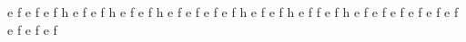 
%
%
\def\freqbarno{9999}
%
\ifx\medleyflag\relax\else
  \nopagenumbers{}\medtall\medwidewidth\fi
\newpitch\newgrace\noautoglue
%
\relax
%
%
%
\generalmeter{\meterC}
\debutmorceau
{}%
\setdoublebar\xbarre
\notes\grg\qlp e\etn
\pince f\cc\etn
\grg\qlc\etn
\echoN\qla\enotes\xbarre
\notes\grg\qlp e\etn
\pince f\cc\etn
\grg\qlb\etn
\echoN\qla\enotes\xbarre
\notes\grg\qlp e\etn
\pince f\cc\etn
\grg\qlc\etn
\pince h\qlf\enotes\xbarre
\notes\grg\qlp e\etn
\pince f\cc\etn
\grg\qlc\etn
\echoN\qla\enotes\xbarre
\notes\grg\qlp e\etn
\pince f\cc\etn
\grg\qlb\etn
\pince h\qlf\enotes\xbarre
\notes\grg\qlp e\etn
\pince f\cc\etn
\grg\qlb\etn
\echoN\qla{}\enotes\setdoublebar\suspmorceau
%
\reprmorceau
\setdoublebar\xbarre
\notes\grg\qlp e\etn
\pince f\cc\etn
\grg\qlc\etn
\pince h\qlf\enotes\xbarre
\notes\grg\qlp e\etn
\pince f\cc\etn
\grg\qlc\etn
\echoN\qla\enotes\xbarre
\notes\grg\qlp e\etn
\pince f\cc\etn
\grg\qlb\etn
\echoN\qla\enotes\xbarre
\notes\grg\qlp e\etn
\pince f\cc\etn
\grg\qlc\etn
\echoN\qla\enotes\xbarre
\notes\grg\qlp e\etn
\pince f\cc\etn
\grg\qlb\etn
\pince h\qlf\enotes\xbarre
\notes\grg\qlp e\etn
\pince f\cc\etn
\grg\qlb\etn
\echoN\qla\enotes\setdoublebar\suspmorceau
%
\reprmorceau
\setdoublebar\xbarre
\notes\grg\qlp e\etn
\pince f\cc\etn
\grg\qlc\etn
\pince h\qlf\enotes\xbarre
\notes\grg\qlp e\etn
\pince f\cc\etn
\grg\qlc\etn
\pince f\qle\enotes\xbarre
\notes\grg\qlp e\etn
\pince f\cc\etn
\grg\qlb\etn
\pince h\qlf\enotes\xbarre
\notes\grg\qlp e\etn
\pince f\cc\etn
\grg\qlb\etn
\echoN\qla\enotes\setdoublebar\suspmorceau
%
%
\reprmorceau
\setdoublebar\xbarre
\notes\grg\qlp e\etn
\pince f\cc\etn
\grg\qlc\etn
\echoN\qla\enotes\xbarre
\notes\grg\qlp e\etn
\pince f\cc\etn
\grg\qlb\etn
\echoN\qla\enotes\xbarre
\notes\grg\qlp e\etn
\pince f\cc\etn
\grg\qlc\etn
{}\qlh\enotes\xbarre
\notes\qlp e\etn
\pince f\cc\etn
\grg\qlc\etn
\echoN\qla\enotes\xbarre
\notes\grg\qlp e\etn
\pince f\cc\etn
\grg\qlb\etn
{}\qlh\enotes\xbarre
\notes\qlp e\etn
\pince f\cc\etn
\grg\qlb\etn
\echoN\qla\enotes\setdoublebar\suspmorceau
%
\reprmorceau
\setdoublebar\xbarre
\notes\grg\qlp e\etn
\pince f\cc\etn
\grg\qlc\etn
{}\qlh\enotes\xbarre
\notes\qlp e\etn
\pince f\cc\etn

